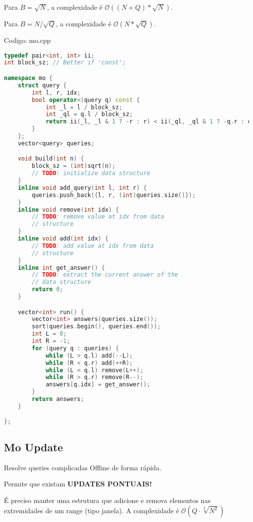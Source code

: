 \documentclass[10pt, a4paper, oneside]{book}
\begin{document}
Para $B = \sqrt{N}$, a complexidade é $\mathcal{O}((N + Q) * \sqrt{N})$.



Para $B = N / \sqrt Q$, a complexidade é $\mathcal{O}(N * \sqrt{Q})$.

\hfill

Codigo: mo.cpp

\begin{lstlisting}[language=C++]
typedef pair<int, int> ii;
int block_sz; // Better if 'const';

namespace mo {
    struct query {
        int l, r, idx;
        bool operator<(query q) const {
            int _l = l / block_sz;
            int _ql = q.l / block_sz;
            return ii(_l, _l & 1 ? -r : r) < ii(_ql, _ql & 1 ? -q.r : q.r);
        }
    };
    vector<query> queries;

    void build(int n) {
        block_sz = (int)sqrt(n);
        // TODO: initialize data structure
    }
    inline void add_query(int l, int r) {
        queries.push_back({l, r, (int)queries.size()});
    }
    inline void remove(int idx) {
        // TODO: remove value at idx from data
        // structure
    }
    inline void add(int idx) {
        // TODO: add value at idx from data
        // structure
    }
    inline int get_answer() {
        // TODO: extract the current answer of the
        // data structure
        return 0;
    }

    vector<int> run() {
        vector<int> answers(queries.size());
        sort(queries.begin(), queries.end());
        int L = 0;
        int R = -1;
        for (query q : queries) {
            while (L > q.l) add(--L);
            while (R < q.r) add(++R);
            while (L < q.l) remove(L++);
            while (R > q.r) remove(R--);
            answers[q.idx] = get_answer();
        }
        return answers;
    }

};
\end{lstlisting}
\hfill

\subsection{Mo Update}


Resolve queries complicadas Offline de forma rápida.   



Permite que existam \textbf{UPDATES PONTUAIS!}  

É preciso manter uma estrutura que adicione e remova elementos nas extremidades de um range (tipo janela). A complexidade é $\mathcal{O}(Q \cdot \sqrt[3]{N^2})$
\end{document}
